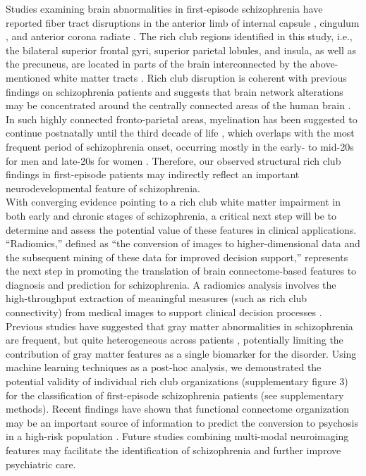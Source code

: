 \begin{refsection}
Studies examining brain abnormalities in first-episode schizophrenia have reported fiber tract disruptions in the anterior limb of internal capsule \citep{Weiss2015ImprovedNA,Kelly2017WidespreadWM}, cingulum \citep{Xiao2018WhiteMA}, and anterior corona radiate \citep{Caprihan2015ThePR,Xi2016TheSC,Asmal2017InsightAW,Subramaniam2017WhiteMM}. The rich club regions identified in this study, i.e., the bilateral superior frontal gyri, superior parietal lobules, and insula, as well as the precuneus, are located in parts of the brain interconnected by the above-mentioned white matter tracts \citep{Greicius2008PersistentDN,vanDenHeuvel2009FunctionallyLR}. Rich club disruption is coherent with previous findings on schizophrenia patients \citep{vanDenHeuvel2013AbnormalRC,Collin2014ImpairedRC} and suggests that brain network alterations may be concentrated around the centrally connected areas of the human brain \citep{Klauser2017WhiteMD,Greicius2008PersistentDN,vanDenHeuvel2009FunctionallyLR}. In such highly connected fronto-parietal areas, myelination has been suggested to continue postnatally until the third decade of life \citep{Marn2016DevelopmentalTA,Silbereis2016TheCA}, which overlaps with the most frequent period of schizophrenia onset, occurring mostly in the early- to mid-20s for men and late-20s for women \citep{Abbas2013DIAGNOSTICAS}. Therefore, our observed structural rich club findings in first-episode patients may indirectly reflect an important neurodevelopmental feature of schizophrenia.\\

With converging evidence pointing to a rich club white matter impairment in both early and chronic stages of schizophrenia, a critical next step will be to determine and assess the potential value of these features in clinical applications. “Radiomics,” defined as “the conversion of images to higher-dimensional data and the subsequent mining of these data for improved decision support,” \citep{Gillies2016RadiomicsIA} represents the next step in promoting the translation \citep{Aerts2016ThePO} of brain connectome-based features to diagnosis and prediction for schizophrenia. A radiomics analysis involves the high-throughput extraction of meaningful measures (such as rich club connectivity) from medical images to support clinical decision processes \citep{Gillies2016RadiomicsIA}. Previous studies have suggested that gray matter abnormalities in schizophrenia are frequent, but quite heterogeneous across patients \citep{Wolfers2018MappingTH}, potentially limiting the contribution of gray matter features as a single biomarker for the disorder. Using machine learning techniques as a post-hoc analysis, we demonstrated the potential validity of individual rich club organizations (supplementary figure 3) for the classification of first-episode schizophrenia patients (see supplementary methods). Recent findings have shown that functional connectome organization may be an important source of information to predict the conversion to psychosis in a high-risk population \citep{Collin2018FunctionalCO}. Future studies combining multi-modal neuroimaging features may facilitate the identification of schizophrenia and further improve psychiatric care.\\


\end{refsection}
